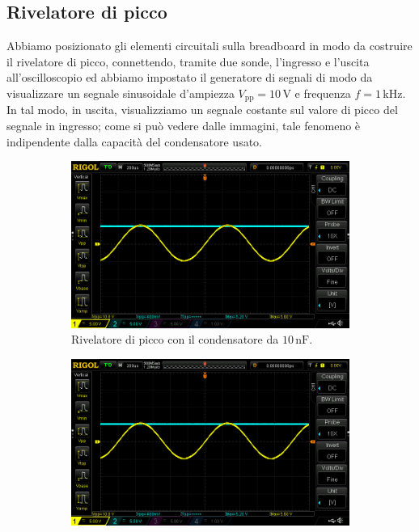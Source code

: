 \documentclass[a4paper]{article}
\begin{document}
		\subsection{Rivelatore di picco}
			Abbiamo posizionato gli elementi circuitali sulla breadboard in modo da costruire il rivelatore di picco, connettendo, tramite due sonde, l'ingresso e l'uscita all'oscilloscopio ed abbiamo impostato il generatore di segnali di modo da visualizzare un segnale sinusoidale d'ampiezza $ V_{\mathrm{pp}} = 10 \, \mathrm{V} $ e frequenza $ f = 1 \, \mathrm{kHz} $.
			\newline
			In tal modo, in uscita, visualizziamo un segnale costante sul valore di picco del segnale in ingresso; come si può vedere dalle immagini, tale fenomeno è indipendente dalla capacità del condensatore usato.
			\begin{figure}[h!]
				\centering
				\begin{subfigure}{0.4\textwidth}
					\centering
					\includegraphics[scale=0.2]{rivelatoreDiPicco10n}
					\caption{Rivelatore di picco con il condensatore da $ 10 \, \mathrm{nF} $.}
				\end{subfigure}
				\begin{subfigure}{0.4\textwidth}
					\centering
					\includegraphics[scale=0.2]{rivelatoreDiPicco100n}

\end{subfigure}
\end{figure}
\end{document}

